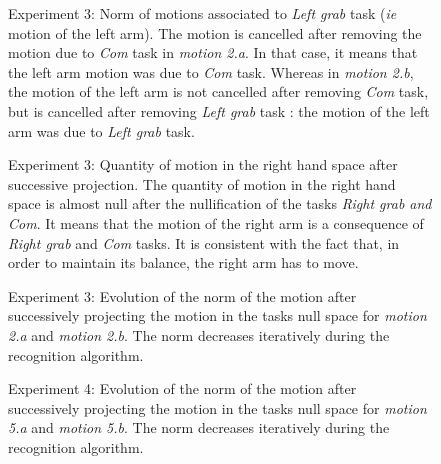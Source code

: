\documentclass[journal]{IEEEtran}
\begin{document}
\begin{figure}[hp]
  \centering
  \subfigure[Motion 2.a]{
  \resizebox{.46\textwidth}{!} {
  
  }
  \label{fig:exp1:Evolution2L:a}
  }
  \subfigure[Motion 2.b]{
  \resizebox{.46\textwidth}{!} {
  
  }
  \label{fig:exp1:Evolution2L:b}
  }
  \caption{Experiment 3: Norm of motions associated to \emph{Left grab} task (\emph{ie} motion of the left arm).
  The motion is cancelled after removing the motion due to \emph{Com} task
  in \emph{motion 2.a}. In that case, it means that the left arm motion was due to \emph{Com} task.
  Whereas in \emph{motion 2.b}, the motion of the left arm is not cancelled after
  removing \emph{Com} task, but is cancelled after removing
  \emph{Left grab} task : the motion of the left arm was due
  to \emph{Left grab} task.}
  \label{fig:exp1:Evolution2L}
\end{figure}
\begin{figure}[p]
  \centering
  \subfigure[Motion 2.a]{
  \resizebox{.46\textwidth}{!} {
  
  }
  \label{fig:exp1:Evolution2R:a}
  }
  \subfigure[Motion 2.b]{
  \resizebox{.46\textwidth}{!} {
  
  }
  \label{fig:exp1:Evolution2R:b}
  }
  \caption{Experiment 3: Quantity of motion in the right hand space after successive projection.
    The quantity of motion in the right hand space is almost null
      after the nullification of the tasks \emph{Right grab and Com}.
  It means that the motion of the right arm is a consequence of
  \emph{Right grab} and \emph{Com} tasks. It is consistent with the fact that,
  in order to maintain its balance, the right arm has to move.}
  \label{fig:exp1:Evolution2R}
\end{figure}
\begin{figure}[p]
  \centering
  \subfigure[Motion 2.a]{
  \resizebox{.46\textwidth}{!} {
    
  }
  \label{fig:exp1:PqdotNormsR}
  }
  \subfigure[Motion 2.b]{
  \resizebox{.46\textwidth}{!} {
    
  }
\label{fig:exp1:PqdotNormsRL}
}
\caption{Experiment 3: Evolution of the norm of the motion after successively projecting the motion in the tasks null space for
\emph{motion 2.a} and \emph{motion 2.b}. The norm decreases iteratively during the recognition algorithm.}
\label{fig:exp1:PqdotNorms}
\end{figure}
\setcounter{figure}{16}
\begin{figure}[p]
  \centering
  \subfigure[Motion 5.a]{
  \resizebox{.46\textwidth}{!} {
    
  }
  }
  \subfigure[Motion 5.b]{
  \resizebox{.46\textwidth}{!} {
    
  }
}
\caption{Experiment 4: Evolution of the norm of the motion after successively projecting the motion in the tasks null space for
\emph{motion 5.a} and \emph{motion 5.b}. The norm decreases iteratively during the recognition algorithm.}
\label{fig:exp6:PqdotNorms5}
\end{figure}
\end{document}
